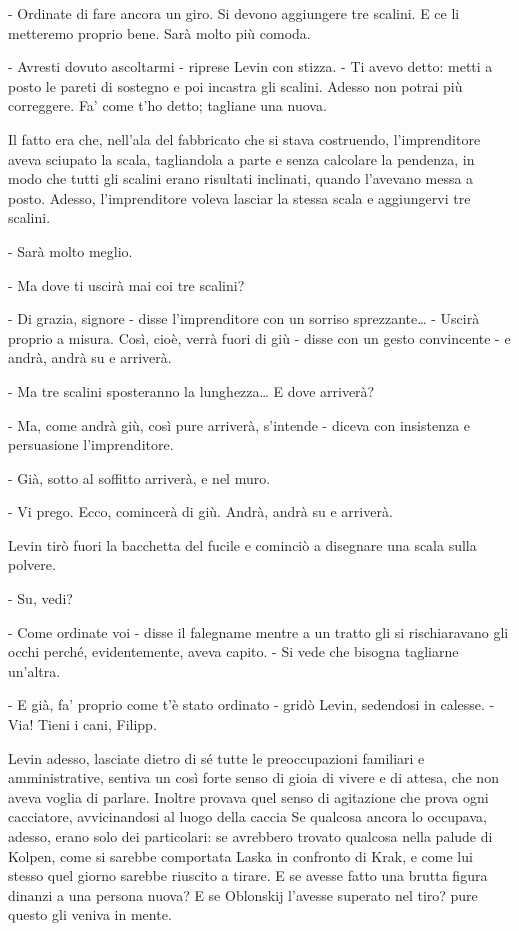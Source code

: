 - Ordinate di fare ancora un giro. Si devono aggiungere tre scalini. E ce li metteremo proprio bene. Sarà molto più comoda. 

- Avresti dovuto ascoltarmi - riprese Levin con stizza. - Ti avevo detto: metti a posto le pareti di sostegno e poi incastra gli scalini. Adesso non potrai più correggere. Fa' come t'ho detto; tagliane una nuova. 

Il fatto era che, nell'ala del fabbricato che si stava costruendo, l'imprenditore aveva sciupato la scala, tagliandola a parte e senza calcolare la pendenza, in modo che tutti gli scalini erano risultati inclinati, quando l'avevano messa a posto. Adesso, l'imprenditore voleva lasciar la stessa scala e aggiungervi tre scalini. 

- Sarà molto meglio. 

- Ma dove ti uscirà mai coi tre scalini? 

- Di grazia, signore - disse l'imprenditore con un sorriso sprezzante\ldots{} - Uscirà proprio a misura. Così, cioè, verrà fuori di giù - disse con un gesto convincente - e andrà, andrà su e arriverà. 

- Ma tre scalini sposteranno la lunghezza\ldots{} E dove arriverà? 

- Ma, come andrà giù, così pure arriverà, s'intende - diceva con insistenza e persuasione l'imprenditore. 

- Già, sotto al soffitto arriverà, e nel muro. 

- Vi prego. Ecco, comincerà di giù. Andrà, andrà su e arriverà. 

Levin tirò fuori la bacchetta del fucile e cominciò a disegnare una scala sulla polvere. 

- Su, vedi? 

- Come ordinate voi - disse il falegname mentre a un tratto gli si rischiaravano gli occhi perché, evidentemente, aveva capito. - Si vede che bisogna tagliarne un'altra. 

- E già, fa' proprio come t'è stato ordinato - gridò Levin, sedendosi in calesse. - Via! Tieni i cani, Filipp. 

Levin adesso, lasciate dietro di sé tutte le preoccupazioni familiari e amministrative, sentiva un così forte senso di gioia di vivere e di attesa, che non aveva voglia di parlare. Inoltre provava quel senso di agitazione che prova ogni cacciatore, avvicinandosi al luogo della caccia Se qualcosa ancora lo occupava, adesso, erano solo dei particolari: se avrebbero trovato qualcosa nella palude di Kolpen, come si sarebbe comportata Laska in confronto di Krak, e come lui stesso quel giorno sarebbe riuscito a tirare. E se avesse fatto una brutta figura dinanzi a una persona nuova? E se Oblonskij l'avesse superato nel tiro? pure questo gli veniva in mente. 

